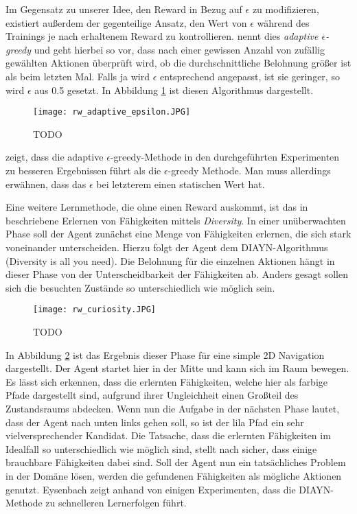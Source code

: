 Im Gegensatz zu unserer Idee, den Reward in Bezug auf $ \epsilon $ zu modifizieren, existiert außerdem der gegenteilige Ansatz, den Wert von $ \epsilon $ während des Trainings je nach erhaltenem Reward zu kontrollieren. \cite{r13_dos2017adaptive} nennt dies \textit{adaptive $ \epsilon $-greedy} und geht hierbei so vor, dass nach einer gewissen Anzahl von zufällig gewählten Aktionen überprüft wird, ob die durchschnittliche Belohnung größer ist als beim letzten Mal. Falls ja wird $ \epsilon $ entsprechend angepasst, ist sie geringer, so wird $ \epsilon $ aus 0.5 gesetzt. In Abbildung \ref{img:rwAdaptiveEpsilon} ist diesen Algorithmus dargestellt. 
\begin{figure}[h!]
    \centering
    \texttt{[image: rw\_adaptive\_epsilon.JPG]}
    \caption{TODO} \label{img:rwAdaptiveEpsilon}
\end{figure}
\cite{r13_dos2017adaptive} zeigt, dass die adaptive $ \epsilon $-greedy-Methode in den durchgeführten Experimenten zu besseren Ergebnissen führt als die $ \epsilon $-greedy Methode. Man muss allerdings erwähnen, dass das $ \epsilon $ bei letzterem einen statischen Wert hat.

Eine weitere Lernmethode, die ohne einen Reward auskommt, ist das in \cite{r02_eysenbach2018diversity} beschriebene Erlernen von Fähigkeiten mittels \textit{Diversity}. In einer unüberwachten Phase soll der Agent zunächst eine Menge von Fähigkeiten erlernen, die sich stark voneinander unterscheiden. Hierzu folgt der Agent dem DIAYN-Algorithmus (\glqq Diversity is all you need\grqq{}). Die Belohnung für die einzelnen Aktionen hängt in dieser Phase von der Unterscheidbarkeit der Fähigkeiten ab. Anders gesagt sollen sich die besuchten Zustände so unterschiedlich wie möglich sein.
\begin{figure}[h!]
    \centering
    \texttt{[image: rw\_curiosity.JPG]}
    \caption{TODO} \label{img:rwCuriosity}
\end{figure}
In Abbildung \ref{img:rwCuriosity} ist das Ergebnis dieser Phase für eine simple 2D Navigation dargestellt. Der Agent startet hier in der Mitte und kann sich im Raum bewegen. Es lässt sich erkennen, dass die erlernten Fähigkeiten, welche hier als farbige Pfade dargestellt sind, aufgrund ihrer Ungleichheit einen Großteil des Zustandsraums abdecken. Wenn nun die Aufgabe in der nächsten Phase lautet, dass der Agent nach unten links gehen soll, so ist der lila Pfad ein sehr vielversprechender Kandidat. Die Tatsache, dass die erlernten Fähigkeiten im Idealfall so unterschiedlich wie möglich sind, stellt nach \cite{r02_eysenbach2018diversity} sicher, dass einige brauchbare Fähigkeiten dabei sind. Soll der Agent nun ein tatsächliches Problem in der Domäne lösen, werden die gefundenen Fähigkeiten als mögliche Aktionen genutzt. Eysenbach zeigt anhand von einigen Experimenten, dass die DIAYN-Methode zu schnelleren Lernerfolgen führt. 


